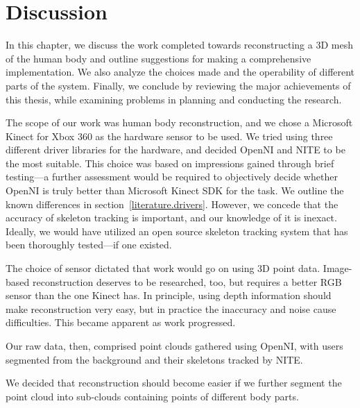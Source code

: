 \chapter{Discussion}

In this chapter, we discuss the work completed towards reconstructing a 3D mesh of the human body and outline suggestions for making a comprehensive implementation. We also analyze the choices made and the operability of different parts of the system. Finally, we conclude by reviewing the major achievements of this thesis, while examining problems in planning and conducting the research.


\newtopic

The scope of our work was human body reconstruction, and we chose a Microsoft Kinect for Xbox 360 as the hardware sensor to be used. We tried using three different driver libraries for the hardware, and decided OpenNI and NITE to be the most suitable. This choice was based on impressions gained through brief testing---a further assessment would be required to objectively decide whether OpenNI is truly better than Microsoft Kinect SDK for the task. We outline the known differences in section~\ref{literature.drivers}. However, we concede that the accuracy of skeleton tracking is important, and our knowledge of it is inexact. Ideally, we would have utilized an open source skeleton tracking system that has been thoroughly tested---if one existed.

The choice of sensor dictated that work would go on using 3D point data. Image-based reconstruction deserves to be researched, too, but requires a better RGB sensor than the one Kinect has. In principle, using depth information should make reconstruction very easy, but in practice the inaccuracy and noise cause difficulties. This became apparent as work progressed.

Our raw data, then, comprised point clouds gathered using OpenNI, with users segmented from the background and their skeletons tracked by NITE.

We decided that reconstruction should become easier if we further segment the point cloud into sub-clouds containing points of different body parts.


